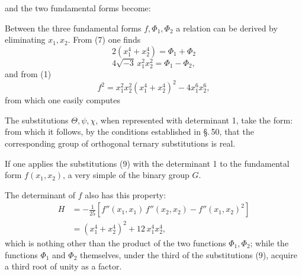 and the two fundamental forms become:

Between the three fundamental forms $f, \Phi_1, \Phi_2$ a relation can be derived by eliminating $x_1, x_2$. From (7) one finds
\[
2(x_1^4+x_2^4) = \Phi_1 + \Phi_2
\]
\[
4\sqrt{-3}\,x_1^2 x_2^2 = \Phi_1 - \Phi_2,
\]
and from (1)
\[
f^2 = x_1^2 x_2^2 (x_1^4+x_2^4)^2 - 4x_1^6 x_2^6,
\]
from which one easily computes

The substitutions $\Theta, \psi, \chi$, when represented with determinant
1, take the form:
from which it follows, by the conditions established in \S.\,50, that
the corresponding group of orthogonal ternary substitutions
is real.

If one applies the substitutions (9) with the determinant 1
to the fundamental form $f(x_1, x_2)$, a very simple
of the binary group $G$.

The  determinant of $f$ also has this property:
\[
\begin{aligned}
H &= -\frac{1}{25}\left[f''(x_1,x_1)\,f''(x_2,x_2) - f''(x_1,x_2)^2\right] \\
&= (x_1^4+x_2^4)^2 + 12\,x_1^4 x_2^4,
\end{aligned}
\]
which is nothing other than the product of the two functions
$\Phi_1, \Phi_2$; while the functions $\Phi_1$ and $\Phi_2$ themselves, under the third
of the substitutions (9), acquire a third root of unity as a
factor.
